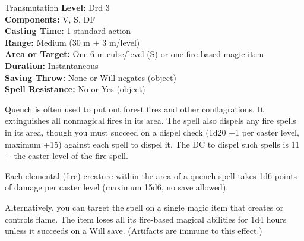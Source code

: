 {Transmutation}
{
	\textbf{Level:}
	Drd 3\\
	\textbf{Components:}
	V, S, DF\\
	\textbf{Casting Time:}
	1 standard action\\
	\textbf{Range:}
	Medium (30 m + 3 m/level)\\
	\textbf{Area or Target:}
	One 6-m cube/level (S) or one fire-based magic item\\
	\textbf{Duration:}
	Instantaneous\\
	\textbf{Saving Throw:}
	None or Will negates (object)\\
	\textbf{Spell Resistance:}
	No or Yes (object)\\
}
{
	Quench is often used to put out forest fires and other conflagrations. It extinguishes all nonmagical fires in its area. The spell also dispels any fire spells in its area, though you must succeed on a dispel check (1d20 +1 per caster level, maximum +15) against each spell to dispel it. The DC to dispel such spells is 11 + the caster level of the fire spell.

	Each elemental (fire) creature within the area of a quench spell takes 1d6 points of damage per caster level (maximum 15d6, no save allowed).

	Alternatively, you can target the spell on a single magic item that creates or controls flame. The item loses all its fire-based magical abilities for 1d4 hours unless it succeeds on a Will save. (Artifacts are immune to this effect.)

}
